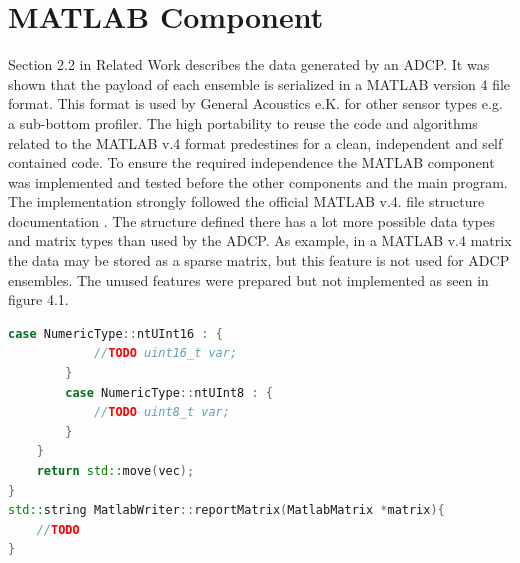 \section{MATLAB Component}
Section 2.2 in Related Work describes the data generated by an ADCP. It was shown that the payload of each ensemble is serialized in a MATLAB version 4 file format. This format is used by General Acoustics e.K. for other sensor types e.g. a sub-bottom profiler. The high portability to reuse the code and algorithms related to the MATLAB v.4 format predestines for a clean, independent and self contained code. To ensure the required independence the MATLAB component was implemented and tested before the other components and the main program.\\
The implementation strongly followed the official MATLAB v.4. file structure documentation \cite{matlab}. The structure defined there has a lot more possible data types and matrix types than used by the ADCP. As example, in a MATLAB v.4 matrix the data may be stored as a sparse matrix, but this feature is not used for ADCP ensembles. The unused features were prepared but not implemented as seen in figure 4.1.
\begin{lstlisting}[language=C++, caption=Code snippet of not implemented logic]
        case NumericType::ntUInt16 : {
            //TODO uint16_t var;
        }
        case NumericType::ntUInt8 : {
            //TODO uint8_t var;
        }
    }
    return std::move(vec);
}
std::string MatlabWriter::reportMatrix(MatlabMatrix *matrix){
    //TODO
}
\end{lstlisting}


